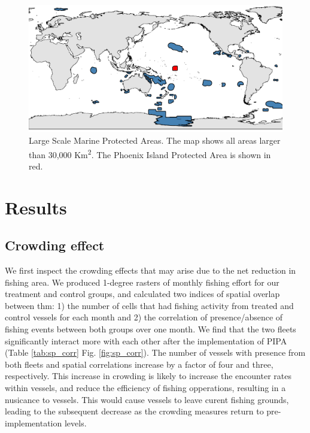 \documentclass[9p,twocolumn,twoside,lineno]{pnas-new}
\begin{document}
\begin{figure}
\centering
\includegraphics{img/LSMPAs_map.pdf}
\caption{\label{fig:LSMPAs_map}Large Scale Marine Protected Areas. The map shows all areas larger than 30,000 Km\textsuperscript{2}. The Phoenix Island Protected Area is shown in red.}
\end{figure}

\section{Results}\label{results}

\subsection{Crowding effect}

We first inspect the crowding effects that may arise due to the net reduction in fishing area. We produced 1-degree rasters of monthly fishing effort for our treatment and control groups, and calculated two indices of spatial overlap between thm: 1) the number of cells that had fishing activity from treated and control vessels for each month and 2) the correlation of presence/absence of fishing events between both groups over one month. We find that the two fleets significantly interact more with each other after the implementation of PIPA (Table \ref{tab:sp_corr} Fig. \ref{fig:sp_corr}). The number of vessels with presence from both fleets and spatial correlations increase by a factor of four and three, respectively. This increase in crowding is likely to increase the encounter rates within vessels, and reduce the efficiency of fishing opperations, resulting in a nusicance to vessels. This would cause vessels to leave curent fishing grounds, leading to the subsequent decrease as the crowding measures return to pre-implementation levels.
\end{document}
